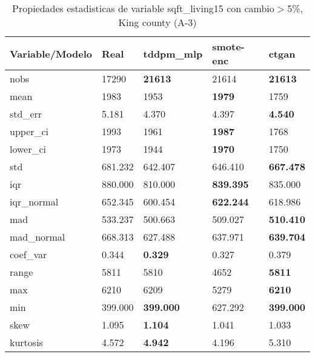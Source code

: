 \begin{table}[H]
\centering
\fontsize{8}{14}\selectfont
\caption{Propiedades estadisticas de variable sqft\_living15 con cambio\ensuremath{>}5\%, King county (A-3)}
\label{table-stats-king county-a-3-sqft_living15-short}
\begin{tabular}{|l|m{10em}|m{10em}|m{10em}|m{10em}|}
\hline
 \rowcolor[gray]{0.8}
Variable/Modelo & Real & tddpm\_mlp & smote-enc & ctgan \\
\hline nobs & 17290 & \bfseries 21613 & \cellcolor[rgb]{0.9, 0.54, 0.52} 21614 & \bfseries 21613 \\
\hline mean & 1983 & 1953 & \bfseries 1979 & \cellcolor[rgb]{0.9, 0.54, 0.52} 1759 \\
\hline std\_err & 5.181 & \cellcolor[rgb]{0.9, 0.54, 0.52} 4.370 & 4.397 & \bfseries 4.540 \\
\hline upper\_ci & 1993 & 1961 & \bfseries 1987 & \cellcolor[rgb]{0.9, 0.54, 0.52} 1768 \\
\hline lower\_ci & 1973 & 1944 & \bfseries 1970 & \cellcolor[rgb]{0.9, 0.54, 0.52} 1750 \\
\hline std & 681.232 & \cellcolor[rgb]{0.9, 0.54, 0.52} 642.407 & 646.410 & \bfseries 667.478 \\
\hline iqr & 880.000 & \cellcolor[rgb]{0.9, 0.54, 0.52} 810.000 & \bfseries 839.395 & 835.000 \\
\hline iqr\_normal & 652.345 & \cellcolor[rgb]{0.9, 0.54, 0.52} 600.454 & \bfseries 622.244 & 618.986 \\
\hline mad & 533.237 & \cellcolor[rgb]{0.9, 0.54, 0.52} 500.663 & 509.027 & \bfseries 510.410 \\
\hline mad\_normal & 668.313 & \cellcolor[rgb]{0.9, 0.54, 0.52} 627.488 & 637.971 & \bfseries 639.704 \\
\hline coef\_var & 0.344 & \bfseries 0.329 & 0.327 & \cellcolor[rgb]{0.9, 0.54, 0.52} 0.379 \\
\hline range & 5811 & 5810 & \cellcolor[rgb]{0.9, 0.54, 0.52} 4652 & \bfseries 5811 \\
\hline max & 6210 & 6209 & \cellcolor[rgb]{0.9, 0.54, 0.52} 5279 & \bfseries 6210 \\
\hline min & 399.000 & \bfseries 399.000 & \cellcolor[rgb]{0.9, 0.54, 0.52} 627.292 & \bfseries 399.000 \\
\hline skew & 1.095 & \bfseries 1.104 & 1.041 & \cellcolor[rgb]{0.9, 0.54, 0.52} 1.033 \\
\hline kurtosis & 4.572 & \bfseries 4.942 & 4.196 & \cellcolor[rgb]{0.9, 0.54, 0.52} 5.310 \\

\end{tabular}
\end{table}
